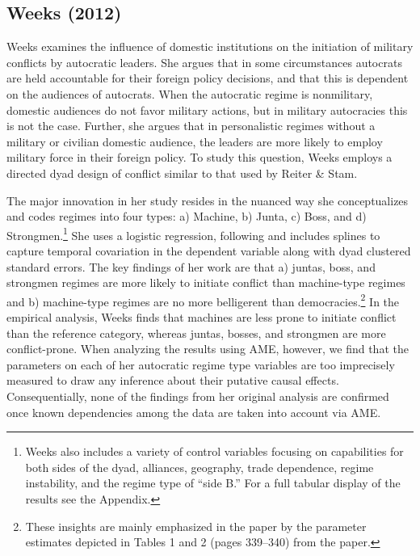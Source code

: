 \subsection{Weeks (2012)}

\nocite{weeks:2012} Weeks examines the influence of domestic institutions on the initiation of military conflicts by autocratic leaders. She argues that in some circumstances autocrats are held accountable for their foreign policy decisions, and that this is dependent on the audiences of autocrats. When the autocratic regime is nonmilitary, domestic audiences do not favor military actions, but in military autocracies this is not the case. Further, she argues that in personalistic regimes without a military or civilian domestic audience, the leaders are more likely to employ military force in their foreign policy. To study this question, Weeks employs a directed dyad design of conflict similar to that used by Reiter \& Stam.

The major innovation in her study resides in the nuanced way she conceptualizes and codes regimes into four types: a) Machine, b) Junta, c) Boss, and d) Strongmen.\footnote{Weeks also includes a variety of control variables focusing on capabilities for both sides of the dyad, alliances, geography, trade dependence, regime instability, and the regime type of ``side B.'' For a full tabular display of the results see the Appendix.} She uses a logistic regression, following \citet{beck:etal:1998} and includes splines to capture temporal covariation in the dependent variable along with dyad clustered standard errors. The key findings of her work are that a) juntas, boss, and strongmen regimes are more likely to initiate conflict than machine-type regimes and b) machine-type regimes are no more belligerent than democracies.\footnote{These insights are mainly emphasized in the paper by the parameter estimates depicted in Tables 1 and 2 (pages 339--340) from the paper.} In the empirical analysis, Weeks finds that machines are less prone to initiate conflict than the reference category, whereas juntas, bosses, and strongmen are more conflict-prone. When analyzing the results using AME, however, we find that the parameters on each of her autocratic regime type variables are too imprecisely measured to draw any inference about their putative causal effects. Consequentially, none of the findings from her original analysis are confirmed once known dependencies among the data are taken into account via AME. 

